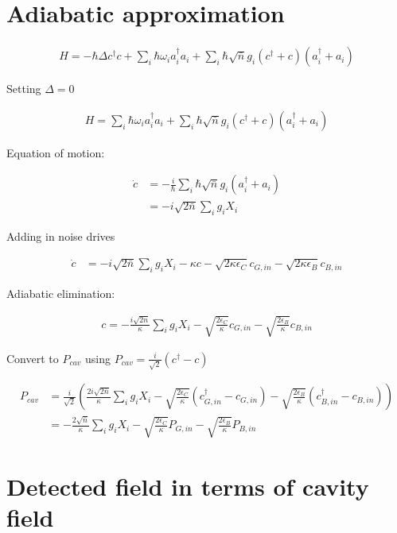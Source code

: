 \documentclass[12pt]{article}
\begin{document}
\section{Adiabatic approximation}

\begin{align}
H = -\hbar \Delta c^{\dag}c + \sum_i \hbar \omega_i a^{\dag}_i a_i + \sum_i \hbar \sqrt{\bar{n}}g_i(c^{\dag}+c)(a^{\dag}_i + a_i)
\end{align}

Setting $\Delta=0$

\begin{align}
H = \sum_i \hbar \omega_i a^{\dag}_i a_i + \sum_i \hbar \sqrt{\bar{n}}g_i(c^{\dag}+c)(a^{\dag}_i + a_i)
\end{align}

Equation of motion:

\begin{align}
\dot{c} &= -\frac{i}{\hbar}\sum_i \hbar \sqrt{\bar{n}}g_i(a^{\dag}_i + a_i)\\
&= -i \sqrt{2\bar{n}}\sum_i g_i X_i
\end{align}

Adding in noise drives

\begin{align}
\dot{c} &= -i \sqrt{2\bar{n}}\sum_i g_i X_i - \kappa c - \sqrt{2\kappa\epsilon_C} c_{G,in} - \sqrt{2\kappa\epsilon_B} c_{B, in}
\end{align}

Adiabatic elimination:

\begin{align}
c = -\frac{i \sqrt{2 \bar{n}}}{\kappa}\sum_i g_iX_i - \sqrt{\frac{2\epsilon_C}{\kappa}}c_{G,in} - \sqrt{\frac{2\epsilon_B}{\kappa}}c_{B,in}
\end{align}

Convert to $P_{cav}$ using $P_{cav} = \frac{i}{\sqrt{2}}(c^{\dag}-c)$

\begin{align}
P_{cav} &= \frac{i}{\sqrt{2}}\left(\frac{2i\sqrt{2\bar{n}}}{\kappa}\sum_i g_i X_i - \sqrt{\frac{2\epsilon_C}{\kappa}}\left(c_{G,in}^{\dag} - c_{G,in}\right) - \sqrt{\frac{2\epsilon_B}{\kappa}}\left(c_{B,in}^{\dag} - c_{B,in}\right)\right)\\
&= -\frac{2\sqrt{\bar{n}}}{\kappa}\sum_i g_i X_i - \sqrt{\frac{2\epsilon_C}{\kappa}}P_{G, in} - \sqrt{\frac{2\epsilon_B}{\kappa}}P_{B, in}
\end{align}

\section{Detected field in terms of cavity field}
\end{document}
